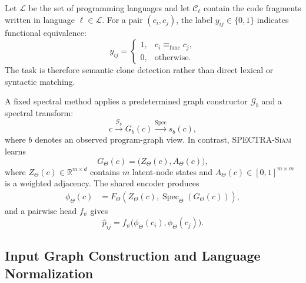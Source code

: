\documentclass[authoryear,final,5p,times,twocolumn]{elsarticle}
\newcommand{\method}{\textsc{SPECTRA-Siam}}
\theoremstyle{plain}
\begin{document}
Let $\mathcal{L}$ be the set of programming languages and let
$\mathcal{C}_{\ell}$ contain the code fragments written in language
$\ell\in\mathcal{L}$. For a pair $(c_i,c_j)$, the label
$y_{ij}\in\{0,1\}$ indicates functional equivalence:
\begin{equation}
y_{ij}=
\begin{cases}
1, & c_i\equiv_{\mathrm{func}}c_j,\\
0, & \text{otherwise}.
\end{cases}
\label{eq:clone_label}
\end{equation}
The task is therefore semantic clone detection rather than direct lexical or
syntactic matching.

A fixed spectral method applies a predetermined graph constructor
$\mathcal{G}_{b}$ and a spectral transform:
\begin{equation}
c\xrightarrow{\mathcal{G}_{b}}G_b(c)
\xrightarrow{\operatorname{Spec}}s_b(c),
\label{eq:fixed_spectrum}
\end{equation}
where $b$ denotes an observed program-graph view. In contrast, \method{} learns
\begin{equation}
G_{\Theta}(c)=\bigl(Z_{\Theta}(c),A_{\Theta}(c)\bigr),
\label{eq:learned_graph}
\end{equation}
where $Z_{\Theta}(c)\in\mathbb{R}^{m\times d}$ contains $m$ latent-node
states and $A_{\Theta}(c)\in[0,1]^{m\times m}$ is a weighted adjacency.
The shared encoder produces
\begin{equation}
\begin{aligned}
\phi_{\Theta}(c)
&=F_{\Theta}\!\left(
Z_{\Theta}(c),
\operatorname{Spec}_{\Theta}(G_{\Theta}(c))
\right),
\end{aligned}
\label{eq:code_embedding}
\end{equation}
and a pairwise head $f_{\psi}$ gives
\begin{equation}
\widehat{p}_{ij}=f_{\psi}\bigl(\phi_{\Theta}(c_i),
\phi_{\Theta}(c_j)\bigr).
\label{eq:pair_probability_general}
\end{equation}

\subsection{Input Graph Construction and Language Normalization}
\label{sec:input_representation}
\end{document}
